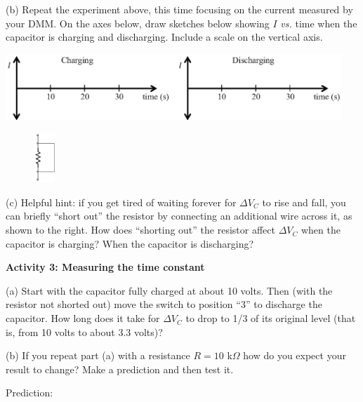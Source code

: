 (b) Repeat the experiment above, this time focusing on the current measured by your DMM.  On the axes below, draw sketches below showing $I$ \textit{vs.} time when the capacitor is charging and discharging.  Include a scale on the vertical axis.
\begin{center}
\vspace{-0.3 in}
\includegraphics[width=0.95\textwidth]{rc_circuits/current_axes.eps}
\vspace{-0.1 in}
\end{center}

\begin{figure}
    \vspace{-0.2 in}
\includegraphics[width=0.07\textwidth]{rc_circuits/shorted_resistor_bw.eps}
\end{figure}


(c)  Helpful hint: if you get tired of waiting forever for $\Delta V_C$ to rise and fall, you can briefly ``short out'' the resistor by connecting an additional wire across it, as shown to the right.  
How does ``shorting out'' the resistor affect $\Delta V_C$ when the capacitor is charging?  When the capacitor is discharging?
\answerspace{0.7in}

\pagebreak[2]
\textbf{Activity 3: Measuring the time constant}

(a) Start with the capacitor fully charged at about 10 volts.  Then (with the resistor not shorted out) move the switch to position “3” to discharge the capacitor.  How long does it take for $\Delta V_C$ to drop to 1/3 of its original level (that is, from 10 volts to about 3.3 volts)?
\vspace{0.8in}

(b) If you repeat part (a) with a resistance $R = 10$ k$\Omega$ how do you expect your result to change?  Make a prediction and then test it.

\vspace{0.2 in}
\hspace{0.4 in} Prediction:
\vspace{0.2 in}

